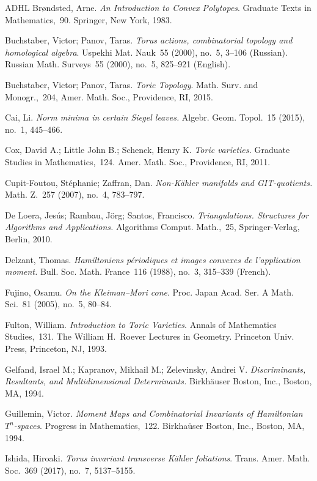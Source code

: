 \documentclass[a4paper]{amsart}
\theoremstyle{definition}
\theoremstyle{remark}
\numberwithin{equation}{section}
\newcommand{\<}{\langle}
\renewcommand{\>}{\rangle}
\begin{document}
\begin{thebibliography}{ADHL}
Br\o ndsted, Arne. \emph{An Introduction to Convex Polytopes}.
Graduate Texts in Mathematics,~90. Springer, New York, 1983.

Buchstaber, Victor; Panov, Taras. \emph{Torus actions,
combinatorial topology and homological algebra}. Uspekhi Mat.
Nauk~55 (2000), no.~5, 3--106 (Russian). Russian Math.
Surveys~55 (2000), no.~5, 825--921 (English).

Buchstaber, Victor; Panov, Taras. \emph{Toric Topology}. Math.
Surv. and Monogr.,~204, Amer. Math. Soc., Providence, RI, 2015.

Cai, Li. \emph{Norm minima in certain Siegel leaves.}
Algebr. Geom. Topol.~15 (2015), no.~1, 445--466. 

Cox, David A.; Little John B.; Schenck, Henry K. \emph{Toric
varieties.} Graduate Studies in Mathematics,~124. Amer. Math.
Soc., Providence, RI, 2011.

Cupit-Foutou, St\'ephanie; Zaffran, Dan.
\emph{Non-K\"ahler manifolds and GIT-quotients.}
Math. Z.~257 (2007), no.~4, 783--797.

De Loera, Jes\'us; Rambau, J\"org; Santos, Francisco.
\emph{Triangulations. Structures for Algorithms and Applications.}
Algorithms Comput. Math.,~25, Springer-Verlag, Berlin, 2010.

Delzant, Thomas.
\emph{Hamiltoniens p\'eriodiques et images convexes de l'application moment.} 
Bull. Soc. Math. France~116 (1988), no.~3, 315--339 (French).

Fujino, Osamu.
\emph{On the Kleiman--Mori cone}.
Proc. Japan Acad. Ser. A Math. Sci.~81 (2005), no.~5, 80--84.

Fulton, William. \emph{Introduction to Toric Varieties}.  Annals of
Mathematics Studies,~131. The William H.~Roever Lectures in
Geometry. Princeton Univ. Press, Princeton, NJ, 1993.

Gelfand, Israel M.; Kapranov, Mikhail M.; Zelevinsky, Andrei V.
\emph{Discriminants, Resultants, and Multidimensional Determinants.}
Birkh\"auser Boston, Inc., Boston, MA, 1994. 

Guillemin, Victor. \emph{Moment Maps and Combinatorial Invariants
of Hamiltonian $T^n$-spaces}. Progress in Mathematics,~122.
Birkha\"user Boston, Inc., Boston, MA, 1994.

Ishida, Hiroaki. \emph{Torus invariant transverse K\"ahler foliations}.
Trans. Amer. Math. Soc.~369 (2017), no.~7, 5137--5155.


\end{thebibliography}
\end{document}
